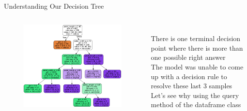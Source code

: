 \documentclass[aspectratio=169]{../latex_main/tntbeamer}  %
\begin{document}
	
	
	
	\begin{frame}{Understanding Our Decision Tree}
	    \begin{columns}
	        \begin{column}{.5\textwidth}
	                \begin{figure}
	                    \includegraphics[scale=.55]{Bild23}
	                \end{figure}
	        \end{column}
	        
	        
	         \begin{column}{.5\textwidth}
	                \\ \bigskip \bigskip
	                There is one terminal decision point where there is more than one possible right answer\\
	                \bigskip
	                The model was unable to come up with a decision rule to resolve these last 3 samples\\
	                \bigskip
	                Let’s see why using the query method of the dataframe class
	        \end{column}
	    \end{columns}
	\end{frame}
	
\end{document}
